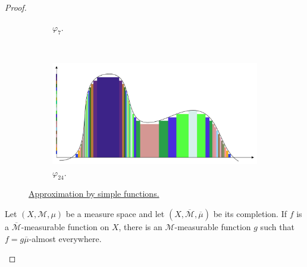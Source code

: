 \documentclass{article}
\theoremstyle{definition}
\numberwithin{equation}{section}
\begin{document}
\begin{itemize}
\begin{proof}
\begin{figure}[H]
\begin{center}
\begin{subfigure}{\linewidth}
	\caption{$\varphi_7$.}
	\label{fig:simple-functions1}
\end{subfigure}
\\
	\begin{subfigure}{\linewidth}
	\centering
	\includegraphics[width=1\linewidth]{fig2}
	\caption{$\varphi_{24}$.}
	\label{fig:simple-functions2}
\end{subfigure}
\end{center}
\caption{\href{https://tex.stackexchange.com/questions/667646/lebesgue-integral-on-tikz}{Approximation by simple functions.}}
\end{figure}
		
		\begin{prop}
			Let $(X,\mathcal{M},\mu)$ be a measure space and let $(X,\overline{\mathcal{M}},\overline{\mu})$ be its completion. If $f$ is a $\overline{\mathcal{M}}$-measurable function on $X$, there is an $\mathcal{M}$-measurable function $g$ such that $f=g\overline{\mu}$-almost everywhere.
		\end{prop}
		

\end{proof}
\end{itemize}
\end{document}

